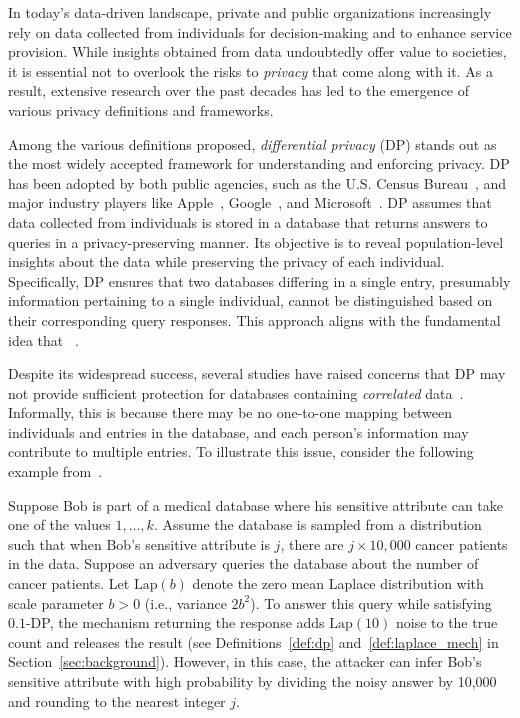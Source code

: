 In today's data-driven landscape, private and public organizations increasingly rely on data collected from individuals for decision-making and to enhance service provision. While insights obtained from data undoubtedly offer value to societies, it is essential not to overlook the risks to \emph{privacy} that come along with it. As a result, extensive research over the past decades has led to the emergence of various privacy definitions and frameworks.

Among the various definitions proposed, \emph{differential privacy} (DP)\cite{dworkDifferentialPrivacy,dworkCalibratingNoiseSensitivity} stands out as the most widely accepted framework for understanding and enforcing privacy. DP has been adopted by both public agencies, such as the U.S. Census Bureau~\cite{abowd2018us}, and major industry players like Apple~\cite{thakurta2017learning}, Google~\cite{erlingsson2014rappor}, and Microsoft~\cite{ding2017collecting}. DP assumes that data collected from individuals is stored in a database that returns answers to queries in a privacy-preserving manner. Its objective is to reveal population-level insights about the data while preserving the privacy of each individual. Specifically, DP ensures that two databases differing in a single entry, presumably information pertaining to a single individual, cannot be distinguished based on their corresponding query responses. This approach aligns with the fundamental idea that ~\cite{dworkDifficultiesDisclosurePrevention2010a}. 

Despite its widespread success, several studies have raised concerns that DP may not provide sufficient protection for databases containing \emph{correlated} data~\cite{kiferNoFreeLunch2011,cormode2011personal,he2014blowfish,liu2016dependence,yang2015bayesian,liMembershipPrivacyUnifying2013,zhu2014correlated}. Informally, this is because there may be no one-to-one mapping between individuals and entries in the database, and each person's information may contribute to multiple entries. To illustrate this issue, consider the following example from~\cite{kiferNoFreeLunch2011}. 

\begin{example}
\label{ex:bob}
Suppose Bob is part of a medical database where his sensitive attribute can take one of the values $1, \ldots, k$. Assume the database is sampled from a distribution such that when Bob's sensitive attribute is $j$, there are $j \times 10,000$ cancer patients in the data. Suppose an adversary queries the database about the number of cancer patients. Let $\mathrm{Lap}(b)$ denote the zero mean Laplace distribution with scale parameter $b>0$ (i.e., variance $2b^2$). To answer this query while satisfying $0.1$-DP, the mechanism returning the response adds $\mathrm{Lap}(10)$ noise to the true count and releases the result (see Definitions~\ref{def:dp} and~\ref{def:laplace_mech} in Section~\ref{sec:background}). However, in this case, the attacker can infer Bob's sensitive attribute with high probability by dividing the noisy answer by 10,000 and rounding to the nearest integer $j$.
\end{example}

